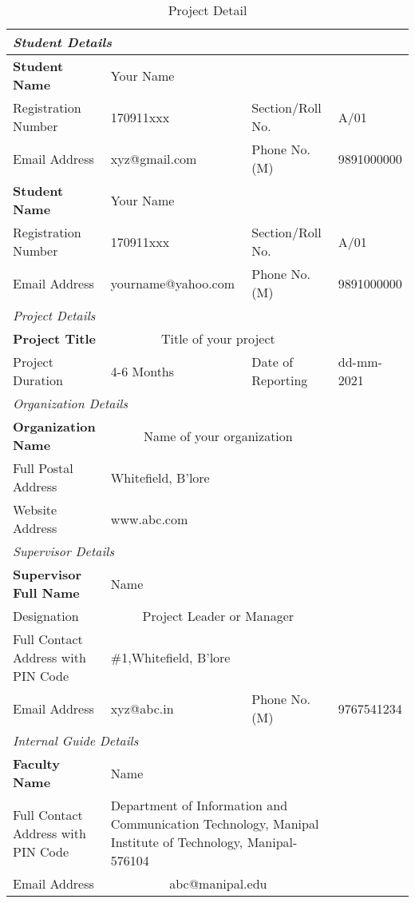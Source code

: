 
\begin{table}
\begin{scriptsize}
\caption{Project Detail}
\begin{tabularx}{\textwidth}{|X|X|X|X|}
\multicolumn{4}{l}{\textit{Student Details}}\\ 
\hline
\textbf{Student Name}&\multicolumn{2}{X}{Your Name}&\\ \hline
Registration Number&170911xxx&Section/Roll No.& A/01\\ \hline
Email Address&\tiny{xyz@gmail.com}&Phone No.(M)&9891000000 \\  \hline
\textbf{Student Name}&\multicolumn{2}{X}{Your Name}&\\ \hline
Registration Number&170911xxx&Section/Roll No.& A/01\\ \hline
Email Address&\tiny{yourname@yahoo.com}&Phone No.(M)&9891000000 \\  \hline
\multicolumn{4}{l}{\textit{Project Details}}\\ \hline
\textbf{Project Title}&\multicolumn{2}{c}{Title of your project}& \\ \hline
Project Duration& 4-6 Months&Date of Reporting& dd-mm-2021 \\ \hline
\multicolumn{4}{l}{\textit{Organization Details}}\\ \hline
\textbf{Organization Name}&\multicolumn{2}{c}{Name of your organization}& \\ \hline
Full Postal Address&\multicolumn{2}{X}{Whitefield, B'lore} &\\ \hline
Website Address&\multicolumn{2}{X}{www.abc.com} &\\ \hline
\multicolumn{4}{l}{\textit{Supervisor Details}}\\ \hline
\textbf{Supervisor Full Name}&\multicolumn{2}{X}{Name}& \\ \hline
Designation&\multicolumn{2}{c}{Project Leader or Manager} &\\ \hline
Full Contact Address with PIN Code&\multicolumn{2}{X}{\#1,Whitefield, B'lore}& \\ \hline
Email Address&xyz@abc.in&Phone No.(M)&9767541234\\ \hline
\multicolumn{4}{l}{\textit{Internal Guide Details}}\\ \hline
\textbf{Faculty Name}&\multicolumn{2}{X}{Name} &\\ \hline
Full Contact Address with PIN Code&\multicolumn{2}{p{8cm}}{Department of Information and Communication Technology,  Manipal Institute of Technology, Manipal-576104}& \\ \hline
Email Address&\multicolumn{2}{c}{abc@manipal.edu}&\\  \hline
\end{tabularx}
\end{scriptsize}
\end{table}

